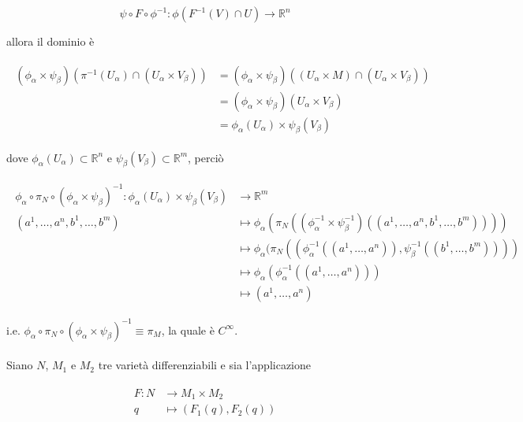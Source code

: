 \begin{equation}
	\psi \circ F \circ \phi^{-1} : \phi(F^{-1}(V) \cap U) \to \mathbb{R}^{n}
\end{equation}

allora il dominio è

\begin{align}
	\begin{split}
		(\phi_{\alpha} \times \psi_{\beta})(\pi^{-1}(U_{\alpha}) \cap (U_{\alpha} \times V_{\beta})) &= (\phi_{\alpha} \times \psi_{\beta})((U_{\alpha} \times M) \cap (U_{\alpha} \times V_{\beta}))\\
		&= (\phi_{\alpha} \times \psi_{\beta})(U_{\alpha} \times V_{\beta})\\
		&= \phi_{\alpha}(U_{\alpha}) \times \psi_{\beta}(V_{\beta})
	\end{split}	
\end{align}

dove $ \phi_{\alpha}(U_{\alpha}) \subset \mathbb{R}^{n} $ e $ \psi_{\beta}(V_{\beta}) \subset \mathbb{R}^{m} $, perciò

\begin{align}
	\begin{split}
		\phi_{\alpha} \circ \pi_{N} \circ (\phi_{\alpha} \times \psi_{\beta})^{-1} : \phi_{\alpha}(U_{\alpha}) \times \psi_{\beta}(V_{\beta}) &\to \mathbb{R}^{m}\\
		(a^{1},\dots,a^{n},b^{1},\dots,b^{m}) &\mapsto \phi_{\alpha} (\pi_{N} ((\phi_{\alpha}^{-1} \times \psi_{\beta}^{-1}) ((a^{1},\dots,a^{n},b^{1},\dots,b^{m}))))\\
		&\mapsto \phi_{\alpha} (\pi_{N} ((\phi_{\alpha}^{-1}((a^{1},\dots,a^{n})),\psi_{\beta}^{-1}((b^{1},\dots,b^{m}))))\\
		&\mapsto \phi_{\alpha} (\phi_{\alpha}^{-1}((a^{1},\dots,a^{n})))\\
		&\mapsto (a^{1},\dots,a^{n})
	\end{split}	
\end{align}

i.e. $ \phi_{\alpha} \circ \pi_{N} \circ (\phi_{\alpha} \times \psi_{\beta})^{-1} \equiv \pi_{M} $, la quale è $ C^{\infty} $.\\\\
%
Siano $ N $, $ M_{1} $ e $ M_{2} $ tre varietà differenziabili e sia l'applicazione

\begin{align}
	\begin{split}
		F : N &\to M_{1} \times M_{2}\\
		q &\mapsto (F_{1}(q),F_{2}(q))
	\end{split}
\end{align}

